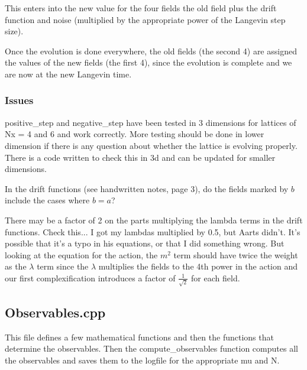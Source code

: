 \documentclass[../../RotatingBosons.tex]{subfiles}
\begin{document}
This enters into the new value for the four fields the old field plus the drift function and noise (multiplied by the appropriate power of the Langevin step size). 

Once the evolution is done everywhere, the old fields (the second 4) are assigned the values of the new fields (the first 4), since the evolution is complete and we are now at the new Langevin time.

\subsubsection{Issues}
positive\_step and negative\_step have been tested in 3 dimensions for lattices of Nx = 4 and 6 and work correctly. More testing should be done in lower dimension if there is any question about whether the lattice is evolving properly. There is a code written to check this in 3d and can be updated for smaller dimensions.

In the drift functions (see handwritten notes, page 3), do the fields marked by $b$ include the cases where $b = a$?

There may be a factor of 2 on the parts multiplying the lambda terms in the drift functions. Check this... I got my lambdas multiplied by 0.5, but Aarts didn't. It's possible that it's a typo in his equations, or that I did something wrong. But looking at the equation for the action, the $m^{2}$ term should have twice the weight as the $\lambda$ term since the $\lambda$ multiplies the fields to the 4th power in the action and our first complexification introduces a factor of $\frac{1}{\sqrt{2}}$ for each field.

\subsection{\label{aartsobservables}Observables.cpp}
This file defines a few mathematical functions and then the functions that determine the observables. Then the compute\_observables function computes all the observables and saves them to the logfile for the appropriate mu and N.
\end{document}
